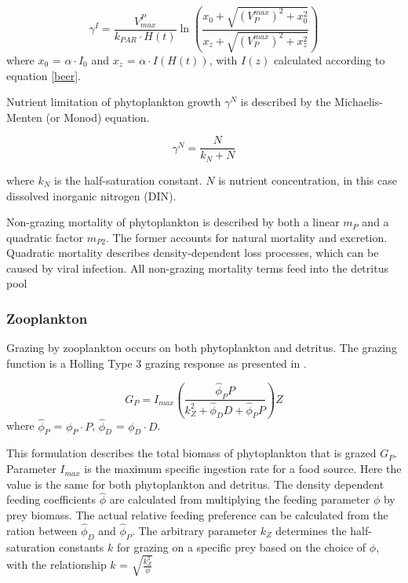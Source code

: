 \documentclass[journal abbreviation, manuscript]{copernicus}
\begin{document}
\begin{equation}
    \gamma^I = \frac{V^P_{max}}{k_{PAR} \cdot H(t)} \ln{ \left( \frac{ x_0+\sqrt{(V^{max}_P)^2+x_0^2} }{ x_z+\sqrt{(V^{max}_P)^2+x_z^2} } \right)}
\end{equation}
where $x_0$ = $\alpha \cdot I_0$ and $x_z$ = $\alpha \cdot I(H(t))$, with $I(z)$ calculated according to equation \eqref{beer}.

Nutrient limitation of phytoplankton growth $\gamma^N$ is described by the Michaelis-Menten (or Monod) equation.

\begin{equation}
    \gamma^N = \frac{N}{k_N + N}
\end{equation}

where $k_N$ is the half-saturation constant. $N$ is nutrient concentration, in this case dissolved inorganic nitrogen (DIN).

Non-grazing mortality of phytoplankton is described by both a linear $m_P$ and a quadratic factor $m_{P2}$. The former accounts for natural mortality and excretion. Quadratic mortality describes density-dependent loss processes, which can be caused by viral infection. All non-grazing mortality terms feed into the detritus pool

\subsubsection{Zooplankton}
Grazing by zooplankton occurs on both phytoplankton and detritus. The grazing function is a Holling Type 3 grazing response as presented in \citet{Anderson2015c}.

\begin{equation}
    G_P = I_{max} \left( \frac{ \hat{\phi}_P P}{k_Z^2 + \hat{\phi}_D D +\hat{\phi}_P P}  \right) Z
\end{equation}
where $\hat{\phi}_P$ = $\phi_P \cdot P$, $\hat{\phi}_D$ = $\phi_D \cdot D$.

This formulation describes the total biomass of phytoplankton that is grazed $G_P$. Parameter $I_{max}$ is the maximum specific ingestion rate for a food source. Here the value is the same for both phytoplankton and detritus. The density dependent feeding coefficients $\hat{\phi}$ are calculated from multiplying the feeding parameter $\phi$ by prey biomass. The actual relative feeding preference can be calculated from the ration between $\hat{\phi}_D$ and $\hat{\phi}_P$. The arbitrary parameter $k_Z$ determines the half-saturation constants $k$ for grazing on a specific prey based on the choice of $\phi$, with the relationship $k$ = $\sqrt{\frac{k^2_Z }{ \phi}}$
\end{document}
